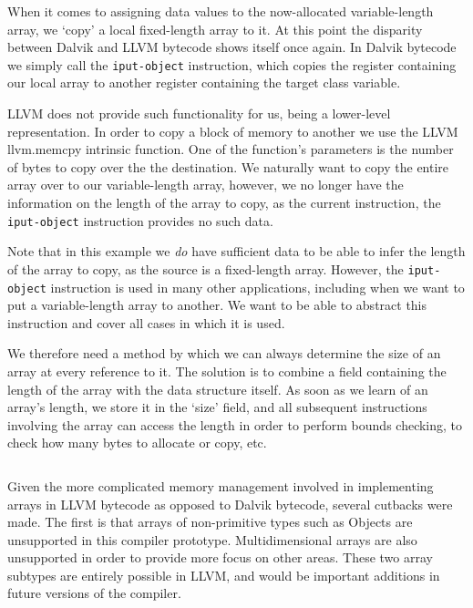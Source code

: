 \begin{lstlisting}[frame=single, caption={LLVM pointer array}, label=lst:llvm_ptr]
%a = i32*
\end{lstlisting}

When it comes to assigning data values to the now-allocated variable-length array, we `copy' a local fixed-length array to it. At this point the disparity between Dalvik and LLVM bytecode shows itself once again. In Dalvik bytecode we simply call the \verb|iput-object| instruction, which copies the register containing our local array to another register containing the target class variable.

LLVM does not provide such functionality for us, being a lower-level representation. In order to copy a block of memory to another we use the LLVM llvm.memcpy intrinsic function. One of the function's parameters is the number of bytes to copy over the the destination. We naturally want to copy the entire array over to our variable-length array, however, we no longer have the information on the length of the array to copy, as the current instruction, the \verb|iput-object| instruction provides no such data.

Note that in this example we \textit{do} have sufficient data to be able to infer the length of the array to copy, as the source is a fixed-length array. However, the \verb|iput-object| instruction is used in many other applications, including when we want to put a variable-length array to another. We want to be able to abstract this instruction and cover all cases in which it is used.


We therefore need a method by which we can always determine the size of an array at every reference to it. The solution is to combine a field containing the length of the array with the data structure itself. As soon as we learn of an array's length, we store it in the `size' field, and all subsequent instructions involving the array can access the length in order to perform bounds checking, to check how many bytes to allocate or copy, etc.

\lstset{
	language=Assembly,
	basicstyle=\small,
	stringstyle=\ttfamily
}
\begin{lstlisting}[frame=single]
%struct_array = { i32, i32* }
\end{lstlisting}

Given the more complicated memory management involved in implementing arrays in LLVM bytecode as opposed to Dalvik bytecode, several cutbacks were made. The first is that arrays of non-primitive types such as Objects are unsupported in this compiler prototype. Multidimensional arrays are also unsupported in order to provide more focus on other areas. These two array subtypes are entirely possible in LLVM, and would be important additions in future versions of the compiler.
